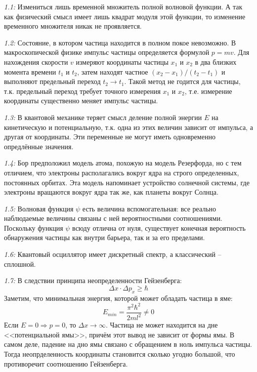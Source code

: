 





	\emph{1.1: }
		Измениться лишь временной множитель полной волновой функции. 
		А так как физический смысл имеет лишь квадрат модуля этой функции,
		то изменение временного множителя никак не проявляется.
	
    \emph{1.2: }
        Состояние, в котором частица находится в полном покое невозможно.
        В макроскопической физике импульс частицы определяется формулой
        \( p = mv \). Для нахождения скорости \( v \) измеряют 
        координаты частицы \( x_1 \) и \( x_2 \) в два близких момента
        времени \( t_1 \) и \( t_2 \), затем находят частное
        \( (x_2 - x_1)/(t_2 - t_1) \) и выполняют предельный переход
        \( t_2 \rightarrow t_1 \). Такой метод не годится для частицы, 
        т.к. предельный переход требует точного измерения \( x_1 \) и 
        \( x_2 \), т.е. измерение координаты существенно меняет импульс
        частицы.

    \emph{1.3: }
        В квантовой механике теряет смысл деление полной энергии \( E \)
        на кинетическую и потенциальную, т.к. одна из этих величин
        зависит от импульса, а другая от координаты. Эти переменные не 
        могут иметь одновременно опредлённые значения.

    \emph{1.4: }
        Бор предположил модель атома, похожую на модель Резерфорда, но 
        с тем отличием, что электроны располагались вокруг ядра 
        на строго определенных, постоянных орбитах. Эта модель 
        напоминает устройство солнечной системы, где электроны вращаются 
        вокруг ядра так же, как планеты вокруг Солнца.

    \emph{1.5: }
        Волновая функция \( \psi \) есть величина вспомогательная: 
        все реально наблюдаемые величины связаны с ней вероятностными
        соотношениями. Поскольку функция \( \psi \) всюду отлична от нуля, 
        существует конечная вероятность обнаружения частицы как внутри 
        барьера, так и за его пределами.

    \emph{1.6: }
        Квантовый осциллятор имеет дискретный спектр, а классический -- 
        сплошной.

    \emph{1.7: }
        В следствии принципа неопределенности Гейзенберга: 
        \[ \Delta x \cdot \Delta p_x \ge \hbar \]
        Заметим, что минимальная энергия, которой может обладать 
        частица в яме:
        \[ E_{min} = \frac{\pi^2\hbar^2}{2ml^2} \neq 0 \]
        Если \( E = 0 \Rightarrow p = 0 \), то 
        \( \Delta x \rightarrow \infty \). Частица не может находится
        на дне <<потенциальной ямы>>, причём этот вывод не зависит 
        от формы ямы. В самом деле, падение на дно ямы связано с 
        обращением в ноль импульса частицы. Тогда неопрделенность 
        координаты становится сколько угодно большой, что противоречит 
        соотношению Гейзенберга.
    
